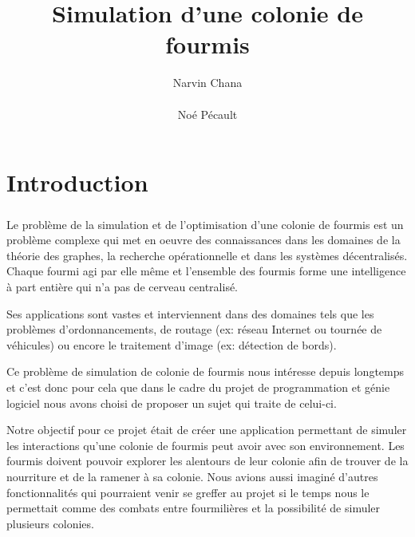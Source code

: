 \documentclass{EPUProjetDi}
\title[Simulation d'une colonie de fourmis]{Simulation d'une colonie de fourmis}
\author{
Narvin Chana\\ %
\noindent[\url{narvin.chana@etu.univ-tours.fr}]\\
Noé Pécault\\ %
\noindent[\url{noe.pecault@etu.univ-tours.fr}]}
\begin{document}
\maketitle

\setcounter{page}{0}

{
\setlength{\parskip}{0em}

\tableofcontents


}


\start

\chapter*{Introduction}

\paragraph{}
Le problème de la simulation et de l'optimisation d'une colonie de fourmis est un problème complexe 
qui met en oeuvre des connaissances dans les domaines de la théorie des graphes, la recherche opérationnelle 
et dans les systèmes décentralisés. Chaque fourmi agi par elle même et l'ensemble des fourmis forme une intelligence
à part entière qui n'a pas de cerveau centralisé.

Ses applications sont vastes et interviennent dans des domaines tels que les problèmes d'ordonnancements, 
de routage (ex: réseau Internet ou tournée de véhicules) ou encore le traitement d'image (ex: détection de bords).

Ce problème de simulation de colonie de fourmis nous intéresse depuis longtemps et c'est donc pour cela que dans 
le cadre du projet de programmation et génie logiciel nous avons choisi de proposer un sujet qui traite de celui-ci.

Notre objectif pour ce projet était de créer une application permettant de simuler les interactions qu'une colonie 
de fourmis peut avoir avec son environnement. Les fourmis doivent pouvoir explorer les alentours de leur colonie afin 
de trouver de la nourriture et de la ramener à sa colonie. 
Nous avions aussi imaginé d'autres fonctionnalités qui pourraient venir se greffer au projet si le temps nous le permettait
comme des combats entre fourmilières et la possibilité de simuler plusieurs colonies.
\end{document}
